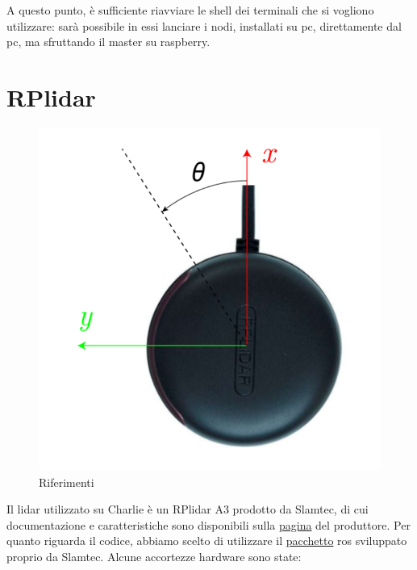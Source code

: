 A questo punto, è sufficiente riavviare le shell dei terminali che si vogliono utilizzare: sarà possibile in essi lanciare i nodi, installati su pc, 
direttamente dal pc, ma sfruttando il master su raspberry.

\section{RPlidar}
\begin{figure}[] 
	\centering    
	\includegraphics[height=.2\textheight]{rplidar_axis.pdf}
	\caption{Riferimenti}
	\label{fig: rplidar axis}
\end{figure}

Il lidar utilizzato su Charlie è un RPlidar A3 prodotto da Slamtec, di cui documentazione e caratteristiche sono disponibili sulla
\href{https://www.slamtec.com/en/Lidar/A3}{pagina} del produttore.
Per quanto riguarda il codice, abbiamo scelto di utilizzare il \href{https://wiki.ros.org/rplidar}{pacchetto} ros sviluppato proprio da Slamtec. 
Alcune accortezze hardware sono state:

